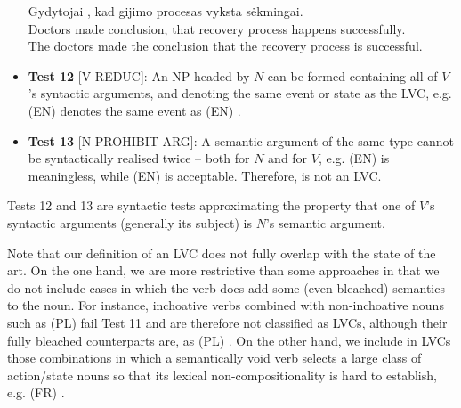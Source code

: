 \documentclass[output=paper,modfonts]{langscibook}
\begin{document}
\begin{itemize}
\ea \label{lt:make-conclusion}
\settowidth {}
\gll Gydytojai  , kad gijimo procesas vyksta sėkmingai. \\
Doctors made conclusion, that recovery process happens successfully.\\ 
\glt The doctors made the conclusion that the recovery process is successful. 
\z


\item[] \textbf{Test 12} [V-REDUC]: An NP headed by $N$ can be formed containing all of $V$'s syntactic arguments, and denoting the same event or state as the LVC, e.g. (EN)  denotes the same event as (EN) . 

\item[] \textbf{Test 13} [N-PROHIBIT-ARG]: A semantic argument of the same type cannot be syntactically realised twice -- both for $N$ and for $V$, e.g. (EN)  is meaningless, while (EN)  is acceptable. Therefore,  is not an LVC. %
    
\end{itemize}

Tests 12 and 13 are syntactic tests approximating the property that one of $V$'s syntactic arguments (generally its subject) is $N$'s semantic argument.

Note that our definition of an LVC does not fully overlap with the state of the art. On the one hand, we are more restrictive than some approaches in that we do not include cases in which the verb does add some (even bleached) semantics to the noun. For instance, inchoative verbs combined with non-inchoative nouns such as (PL)  fail Test 11 and are therefore not classified as LVCs, although their fully bleached counterparts are, as (PL) . On the other hand, we include in LVCs those combinations in which a semantically void verb selects a large class of action/state nouns so that its lexical non-com\-po\-si\-tio\-na\-li\-ty is hard to establish, e.g. (FR)  .
\end{document}
